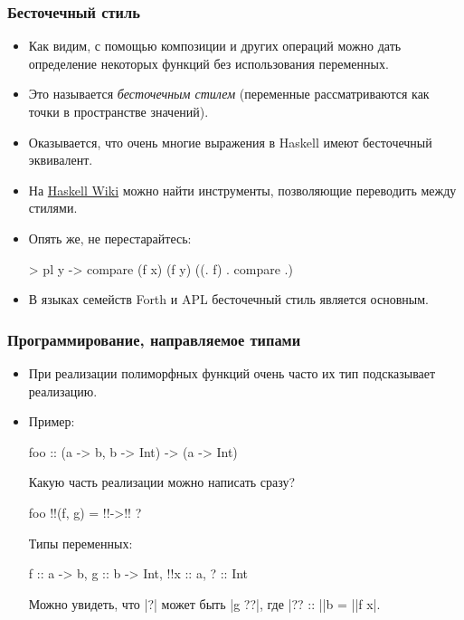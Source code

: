 \documentclass[10pt]{beamer}
\begin{document}
\begin{frame}[fragile]
  \frametitle{Бесточечный стиль}
  \begin{itemize}
    \item Как видим, с помощью композиции и других операций можно дать определение некоторых функций без использования переменных.
    \item Это называется \emph{бесточечным стилем} (переменные рассматриваются как точки в пространстве значений).\pause
    \item Оказывается, что очень многие выражения в Haskell имеют бесточечный эквивалент.
    \item На \href{https://wiki.haskell.org/Pointfree}{Haskell Wiki} можно найти инструменты, позволяющие переводить между стилями.
    \item Опять же, не перестарайтесь:
          \begin{haskell}
            > pl \x y -> compare (f x) (f y)
            ((. f) . compare .)
          \end{haskell}
          \pause
    \item В языках семейств Forth и APL бесточечный стиль является основным.
  \end{itemize}
\end{frame}

\begin{frame}[fragile]
  \frametitle{Программирование, направляемое типами}
  \begin{itemize}
    \item При реализации полиморфных функций очень часто их тип подсказывает реализацию.
    \item Пример:
          \begin{haskell}
            foo :: (a -> b, b -> Int) -> (a -> Int)
          \end{haskell}
          Какую часть реализации можно написать сразу?
          \begin{haskell}
            foo !\pause!(f, g) = !\pause!\x ->!\pause! ?
          \end{haskell}
          Типы переменных:\pause
          \begin{haskell}
            f :: a -> b, g :: b -> Int, !\pause!x :: a, ? :: Int
          \end{haskell}
          Можно увидеть, что \haskinline|?| может быть \haskinline|g ??|, где \haskinline|?? :: |\pause\haskinline|b = |\pause\haskinline|f x|.
  \end{itemize}
\end{frame}
\end{document}
